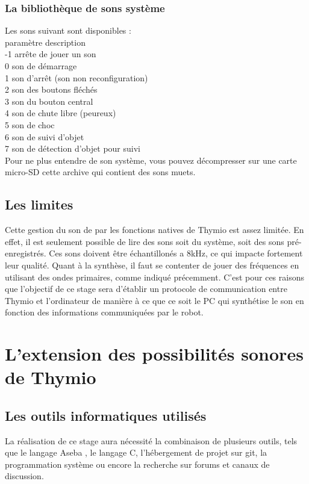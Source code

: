 \documentclass[a4paper, 12pt]{report}
\begin{document}
\subsection{La bibliothèque de sons système}
Les sons suivant sont disponibles :\\
paramètre 	description\\
-1 	arrête de jouer un son\\
0 	son de démarrage\\
1 	son d'arrêt (son non reconfiguration)\\
2 	son des boutons fléchés\\
3 	son du bouton central\\
4 	son de chute libre (peureux)\\
5 	son de choc\\
6 	son de suivi d'objet\\
7 	son de détection d'objet pour suivi\\
Pour ne plus entendre de son système, vous pouvez décompresser sur une carte micro-SD cette archive qui contient des sons muets.

\section{Les limites}
Cette gestion du son de par les fonctions natives de Thymio \pageref{thymio} est assez limitée. En effet, il est seulement possible de lire des sons soit du système, soit des sons pré-enregistrés. Ces sons doivent être échantillonés a 8kHz, ce qui impacte fortement leur qualité. Quant à la synthèse, il faut se contenter de jouer des fréquences en utilisant des ondes primaires, comme indiqué précemment. C'est pour ces raisons que l'objectif de ce stage sera d'établir un protocole de communication entre Thymio \pageref{thymio} et l'ordinateur de manière à ce que ce soit le PC qui synthétise le son en fonction des informations communiquées par le robot.

\chapter{L'extension des possibilités sonores de Thymio \pageref{thymio} }
\section{Les outils informatiques utilisés}
La réalisation de ce stage aura nécessité la combinaison de plusieurs outils, tels que le langage Aseba \pageref{aseba}, le langage C, l'hébergement de projet sur git, la programmation système ou encore la recherche sur forums et canaux de discussion.
\end{document}
